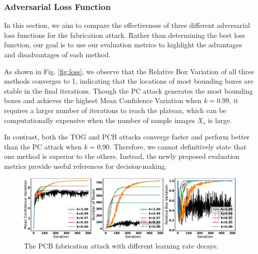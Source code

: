 
\subsubsection{Adversarial Loss Function}

In this section, we aim to compare the effectiveness of three different adversarial loss functions for the fabrication attack. Rather than determining the best loss function, our goal is to use our evaluation metrics to highlight the advantages and disadvantages of each method.


As shown in Fig. \ref{fig:loss}, we observe that the Relative Box Variation of all three methods converges to 1, indicating that the locations of most bounding boxes are stable in the final iterations. Though the PC attack generates the most bounding boxes and achieves the highest Mean Confidence Variation when $k=0.99$, it requires a larger number of iterations to reach the plateau, which can be computationally expensive when the number of sample images $X_{s}$ is large.

In contrast, both the TOG and PCB attacks converge faster and perform better than the PC attack when $k=0.90$. Therefore, we cannot definitively state that one method is superior to the others. Instead, the newly proposed evaluation metrics provide useful references for decision-making.


\begin{figure}[t]
    \centering
    \includegraphics[width=0.9\linewidth]{figures/chapter_detection/lr.png}
    \caption{The PCB fabrication attack with different learning rate decays.}
    \label{fig:decay}
\end{figure}

